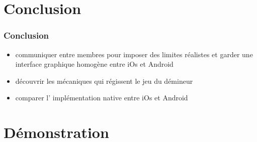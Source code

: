 \documentclass{beamer}
\begin{document}
\section{Conclusion}

\begin{frame}
  \frametitle{Conclusion}
  \begin{itemize}
    \item communiquer entre membres pour imposer des limites réalistes et garder une interface graphique homogène entre iOs et Android
    \item découvrir les mécaniques qui régissent le jeu du démineur
    \item comparer l' implémentation native entre iOs et Android \\
\end{itemize}

\end{frame}

\section{Démonstration}
\end{document}
